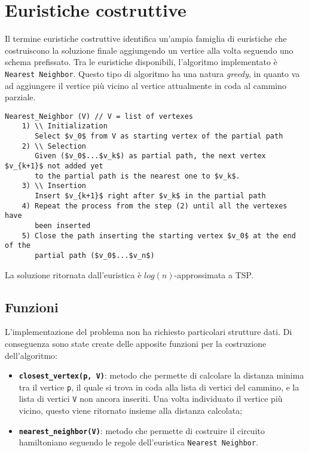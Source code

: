 \section{Euristiche costruttive}\label{constructive_heuristic}

Il termine euristiche costruttive identifica un'ampia famiglia di euristiche che costruiscono la soluzione finale aggiungendo un vertice alla volta seguendo uno schema prefissato. Tra le euristiche disponibili, l'algoritmo implementato è \texttt{Nearest Neighbor}. Questo tipo di algoritmo ha una natura \textit{greedy}, in quanto va ad aggiungere il vertice più vicino al vertice attualmente in coda al cammino parziale.

\begin{lstlisting}[mathescape=true]
Nearest_Neighbor (V) // V = list of vertexes
	1) \\ Initialization
	   Select $v_0$ from V as starting vertex of the partial path
	2) \\ Selection
	   Given ($v_0$...$v_k$) as partial path, the next vertex $v_{k+1}$ not added yet 
	   to the partial path is the nearest one to $v_k$. 
	3) \\ Insertion
	   Insert $v_{k+1}$ right after $v_k$ in the partial path
	4) Repeat the process from the step (2) until all the vertexes have
	   been inserted
	5) Close the path inserting the starting vertex $v_0$ at the end of the
	   partial path ($v_0$...$v_n$)
\end{lstlisting}

La soluzione ritornata dall'euristica è $log(n)$-approssimata a TSP.

\subsection{Funzioni}
L'implementazione del problema non ha richiesto particolari strutture dati. Di conseguenza sono state create delle apposite funzioni per la costruzione dell'algoritmo:
\begin{itemize}
	\item \texttt{\textbf{closest\_vertex(p, V)}}: metodo che permette di calcolare la distanza minima tra il vertice \texttt{p}, il quale si trova in coda alla lista di vertici del cammino, e la lista di vertici \texttt{V} non ancora inseriti. Una volta individuato il vertice più vicino, questo viene ritornato insieme alla distanza calcolata;
	\item \texttt{\textbf{nearest\_neighbor(V)}}: metodo che permette di costruire il circuito hamiltoniano seguendo le regole dell'euristica \texttt{Nearest Neighbor}. 
\end{itemize}

